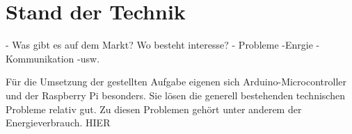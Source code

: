 \section{Stand der Technik}
- Was gibt es auf dem Markt? Wo besteht interesse?
- Probleme
	-Enrgie
	-Kommunikation
	-usw.
	
Für die Umsetzung der gestellten Aufgabe eigenen sich Arduino-Microcontroller und der Raspberry Pi besonders. Sie lösen die generell bestehenden technischen Probleme relativ gut. Zu diesen Problemen gehört unter anderem der Energieverbrauch. HIER  	
